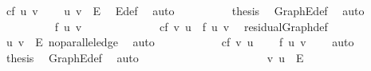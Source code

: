 \begin{isabellebody}
\ {\isachardoublequoteopen}cf\ {\isacharparenleft}u{\isacharcomma}\ v{\isacharparenright}\ {\isasymnoteq}\ {}{\isachardoublequoteclose}\ \isamarkupfalse%
\ {\isacharbackquoteopen}{\isacharparenleft}u{\isacharcomma}\ v{\isacharparenright}\ {\isasymin}\ E{\isacharbackquoteclose}\ \isamarkupfalse%
\ E{\isacharunderscore}def\ \isamarkupfalse%
\ auto\isanewline
\ \ \ \ \ \ \ \ \isamarkupfalse%
\ {\isacharquery}thesis\ \isamarkupfalse%
\ Graph{\isachardot}E{\isacharunderscore}def\ \isamarkupfalse%
\ auto\isanewline
\ \ \ \ \ \ \isamarkupfalse%
\isanewline
\ \ \ \ \ \ \ \ \isamarkupfalse%
\ {\isachardoublequoteopen}f\ {\isacharparenleft}u{\isacharcomma}\ v{\isacharparenright}\ {\isasymnoteq}\ {}{\isachardoublequoteclose}\isanewline
\ \ \ \ \ \ \ \ \isamarkupfalse%
\ \isamarkupfalse%
\ {\isachardoublequoteopen}cf\ {\isacharparenleft}v{\isacharcomma}\ u{\isacharparenright}\ {\isacharequal}\ f\ {\isacharparenleft}u{\isacharcomma}\ v{\isacharparenright}{\isachardoublequoteclose}\ \isamarkupfalse%
\ residualGraph{\isacharunderscore}def\isanewline
\ \ \ \ \ \ \ \ \ \ \isamarkupfalse%
\ {\isacharbackquoteopen}{\isacharparenleft}u{\isacharcomma}\ v{\isacharparenright}\ {\isasymin}\ E{\isacharbackquoteclose}\ no{\isacharunderscore}parallel{\isacharunderscore}edge\ \isamarkupfalse%
\ auto\isanewline
\ \ \ \ \ \ \ \ \isamarkupfalse%
\ \isamarkupfalse%
\ {\isachardoublequoteopen}cf\ {\isacharparenleft}v{\isacharcomma}\ u{\isacharparenright}\ {\isasymnoteq}\ {}{\isachardoublequoteclose}\ \isamarkupfalse%
\ {\isacartoucheopen}f\ {\isacharparenleft}u{\isacharcomma}\ v{\isacharparenright}\ {\isasymnoteq}\ {}{\isacartoucheclose}\ \isamarkupfalse%
\ auto\isanewline
\ \ \ \ \ \ \ \ \isamarkupfalse%
\ {\isacharquery}thesis\ \isamarkupfalse%
\ Graph{\isachardot}E{\isacharunderscore}def\ \isamarkupfalse%
\ auto\isanewline
\ \ \ \ \ \ \isamarkupfalse%
\isanewline
\ \ \ \ \isacommand{{\isacharbraceright}}\isamarkupfalse%
\ \isamarkupfalse%
\ \isacommand{{\isacharbraceleft}}\isamarkupfalse%
\isanewline
\ \ \ \ \ \ \isamarkupfalse%
\ {\isachardoublequoteopen}{\isacharparenleft}v{\isacharcomma}\ u{\isacharparenright}\ {\isasymin}\ E{\isachardoublequoteclose}\isanewline

\end{isabellebody}
